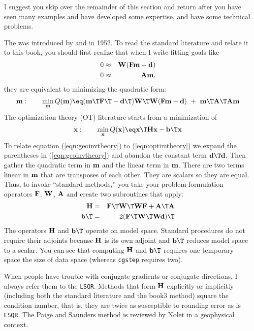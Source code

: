 \par
I suggest you skip over the remainder of this section and return
after you have seen many examples and have developed some expertise,
and have some technical problems.
\par
The  was introduced
by  and  in 1952.
To read the standard literature and relate it to this book,
you should first realize that when I write fitting goals like
\begin{eqnarray}
 0  &\approx&  \bold W( \bold F \bold m - \bold d ) \\
 0  &\approx&  \bold A \bold m,
\end{eqnarray}
they are equivalent to minimizing the quadratic form:
\begin{equation}
\bold  m:  \quad\quad
\min_{\bold m}  Q(\bold m) \eq
( \bold m\T\bold F\T - \bold d\T)\bold W\T\bold W
( \bold F \bold m  - \bold d)
\ +\ \bold m\T\bold A\T\bold A\bold m
\label{eqn:geoinvtheory}
\end{equation}
The optimization theory (OT) literature starts from a minimization of
\begin{equation}
 \bold x:  \quad\quad
 \min_{\bold x} Q(\bold x) \eq \bold x\T\bold H \bold x - \bold b\T \bold x
\label{eqn:optimtheory}
\end{equation}
To relate equation (\ref{eqn:geoinvtheory}) to (\ref{eqn:optimtheory})
we expand the parentheses in (\ref{eqn:geoinvtheory}) 
and abandon the constant term $\bold d\T\bold d$.
Then gather the quadratic term in $\bold m$ and the linear term in $\bold m$.
There are two terms linear in $\bold m$
that are transposes of each other.
They are scalars so they are equal.
Thus, to invoke ``standard methods,'' you take
your problem-formulation operators $\bold F$, $\bold W$, $\bold A$
and create two subroutines that apply:
\begin{eqnarray}
 \bold H   &=&  \bold F\T\bold W\T\bold W\bold F + \bold A\T\bold A  \\
 \bold b\T  &=&  2(\bold F\T\bold W\T\bold W\bold d)\T
\end{eqnarray}
The operators $\bold H$ and $\bold b\T$ operate on model space.
Standard procedures do not require their adjoints
because $\bold H$ is its own adjoint and $\bold b\T$
reduces model space to a scalar.
You can see that computing $\bold H$ and $\bold b\T$ requires
one temporary space the size of data space
(whereas \texttt{cgstep} requires two).
\par
When people have trouble with conjugate gradients or conjugate
directions, I always refer them to the  {\tt LSQR}.  Methods that form $\bold H$ explicitly or
implicitly (including both the standard literature and the book3
method) square the condition number, that is, they are twice as
susceptible to rounding error as is {\tt LSQR}. The Paige and
Saunders method is reviewed by Nolet in a geophysical context. 

